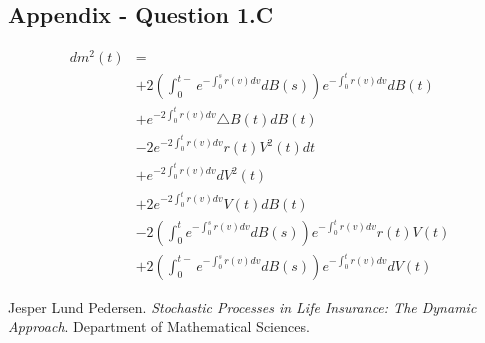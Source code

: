 \documentclass[12pt]{article}
\begin{document}
\subsection{Appendix - Question 1.C}
\begin{equation}
\begin{split}
dm^2(t) & = \\
& + 2(\int_0^{t-} e^{-\int_0^s {r(v) dv}}dB(s))e^{-\int_0^t r(v)dv}dB(t) \\
& + e^{-2\int_0^t r(v)dv} \triangle B(t)dB(t) \\
& - 2e^{-2\int_0^t r(v)dv} r(t) V^2(t)dt \\
& + e^{-2\int_0^t r(v)dv} dV^2(t) \\
& + 2e^{-2\int_0^t r(v)dv} V(t)dB(t) \\
& -2(\int_0^{t} e^{-\int_0^s {r(v) dv}}dB(s))e^{-\int_0^t r(v)dv}r(t)V(t) \\
& + 2(\int_0^{t-} e^{-\int_0^s {r(v) dv}}dB(s))e^{-\int_0^t r(v)dv}dV(t) 
\end{split}
\end{equation}

\newpage

\begin{thebibliography}{9}

  Jesper Lund Pedersen.
  \textit{Stochastic Processes in Life Insurance: The Dynamic Approach}.
  Department of Mathematical Sciences.

\end{thebibliography}
\end{document}
